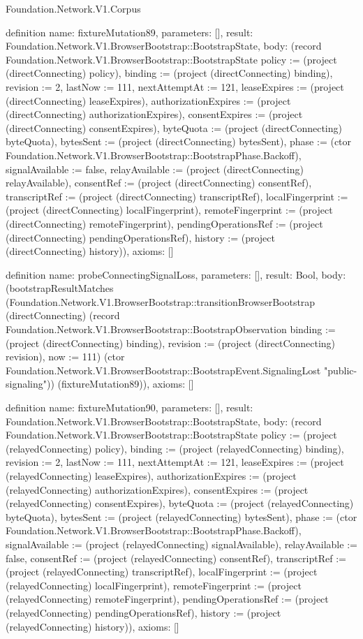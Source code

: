 \begin{lexlean}{Foundation.Network.V1.Corpus}
\begin{semanticmodule}
definition{
  name: fixtureMutation89,
  parameters: [],
  result: Foundation.Network.V1.BrowserBootstrap::BootstrapState,
  body: (record Foundation.Network.V1.BrowserBootstrap::BootstrapState {policy := (project (directConnecting) policy), binding := (project (directConnecting) binding), revision := 2, lastNow := 111, nextAttemptAt := 121, leaseExpires := (project (directConnecting) leaseExpires), authorizationExpires := (project (directConnecting) authorizationExpires), consentExpires := (project (directConnecting) consentExpires), byteQuota := (project (directConnecting) byteQuota), bytesSent := (project (directConnecting) bytesSent), phase := (ctor Foundation.Network.V1.BrowserBootstrap::BootstrapPhase.Backoff), signalAvailable := false, relayAvailable := (project (directConnecting) relayAvailable), consentRef := (project (directConnecting) consentRef), transcriptRef := (project (directConnecting) transcriptRef), localFingerprint := (project (directConnecting) localFingerprint), remoteFingerprint := (project (directConnecting) remoteFingerprint), pendingOperationsRef := (project (directConnecting) pendingOperationsRef), history := (project (directConnecting) history)}),
  axioms: []
}

definition{
  name: probeConnectingSignalLoss,
  parameters: [],
  result: Bool,
  body: (bootstrapResultMatches (Foundation.Network.V1.BrowserBootstrap::transitionBrowserBootstrap (directConnecting) (record Foundation.Network.V1.BrowserBootstrap::BootstrapObservation {binding := (project (directConnecting) binding), revision := (project (directConnecting) revision), now := 111}) (ctor Foundation.Network.V1.BrowserBootstrap::BootstrapEvent.SignalingLost "public-signaling")) (fixtureMutation89)),
  axioms: []
}

definition{
  name: fixtureMutation90,
  parameters: [],
  result: Foundation.Network.V1.BrowserBootstrap::BootstrapState,
  body: (record Foundation.Network.V1.BrowserBootstrap::BootstrapState {policy := (project (relayedConnecting) policy), binding := (project (relayedConnecting) binding), revision := 2, lastNow := 111, nextAttemptAt := 121, leaseExpires := (project (relayedConnecting) leaseExpires), authorizationExpires := (project (relayedConnecting) authorizationExpires), consentExpires := (project (relayedConnecting) consentExpires), byteQuota := (project (relayedConnecting) byteQuota), bytesSent := (project (relayedConnecting) bytesSent), phase := (ctor Foundation.Network.V1.BrowserBootstrap::BootstrapPhase.Backoff), signalAvailable := (project (relayedConnecting) signalAvailable), relayAvailable := false, consentRef := (project (relayedConnecting) consentRef), transcriptRef := (project (relayedConnecting) transcriptRef), localFingerprint := (project (relayedConnecting) localFingerprint), remoteFingerprint := (project (relayedConnecting) remoteFingerprint), pendingOperationsRef := (project (relayedConnecting) pendingOperationsRef), history := (project (relayedConnecting) history)}),
  axioms: []
}


\end{semanticmodule}
\end{lexlean}
